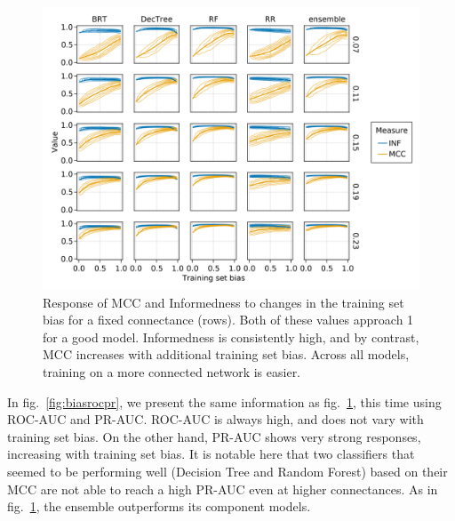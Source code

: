 \documentclass[10pt,oneside]{article}
\makeatletter
\def\maxwidth{\ifdim\Gin@nat@width>\linewidth\linewidth
\else\Gin@nat@width\fi}
\let\Oldincludegraphics\includegraphics
\renewcommand{\includegraphics}[1]{\Oldincludegraphics[width=\maxwidth]{#1}}
\makeatother
\begin{document}
\begin{figure}
\hypertarget{fig:biasmccinf}{%
\centering
\includegraphics{figures/bias_mcc_inf.png}
\caption{Response of MCC and Informedness to changes in the training set
bias for a fixed connectance (rows). Both of these values approach 1 for
a good model. Informedness is consistently high, and by contrast, MCC
increases with additional training set bias. Across all models, training
on a more connected network is easier.}\label{fig:biasmccinf}
}
\end{figure}

In fig.~\ref{fig:biasrocpr}, we present the same information as
fig.~\ref{fig:biasmccinf}, this time using ROC-AUC and PR-AUC. ROC-AUC
is always high, and does not vary with training set bias. On the other
hand, PR-AUC shows very strong responses, increasing with training set
bias. It is notable here that two classifiers that seemed to be
performing well (Decision Tree and Random Forest) based on their MCC are
not able to reach a high PR-AUC even at higher connectances. As in
fig.~\ref{fig:biasmccinf}, the ensemble outperforms its component
models.
\end{document}
